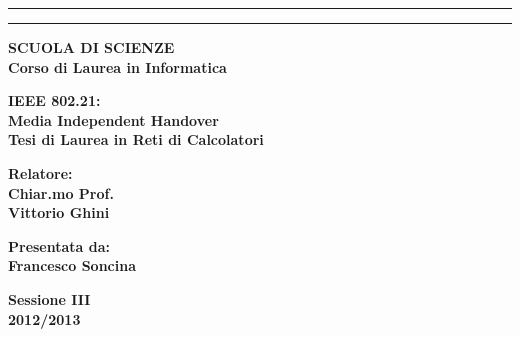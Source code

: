 \documentclass [a4paper,12pt]{book}
\begin{document}
\begin{titlepage}
\begin{center}
\rule[0.1cm]{13.3cm}{0.1mm}
\rule[0.5cm]{13.3cm}{0.6mm}
{\small{\bf SCUOLA DI SCIENZE\\
Corso di Laurea in Informatica }}
\end{center}
\vspace{15mm}
\begin{center}
{\LARGE{\bf IEEE 802.21:}}\\
\vspace{3mm}
{\LARGE{\bf Media Independent Handover}}\\
\vspace{19mm} {\large{\bf Tesi di Laurea in Reti di Calcolatori}}
\end{center}
\vspace{40mm}
\par
\noindent
\begin{minipage}[t]{0.47\textwidth}
{\large{\bf Relatore:\\
Chiar.mo Prof.\\
Vittorio Ghini}}
\end{minipage}
\hfill
\begin{minipage}[t]{0.47\textwidth}\raggedleft
{\large{\bf Presentata da:\\
Francesco Soncina}}
\end{minipage}
\vspace{20mm}
\begin{center}
{\large{\bf Sessione III\\%
2012/2013 }}%
\end{center}
\end{titlepage}
\tableofcontents





\end{document}
